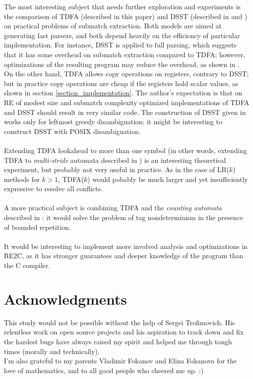 \documentclass{article}
\theoremstyle{definition}
\begin{document}
\begin{multicols}{2}
The most interesting subject that needs further exploration and experiments
is the comparison of TDFA (described in this paper) and DSST (described in \cite{Gra15} and \cite{GHRST16})
on practical problems of submatch extraction.
Both models are aimed at generating fast parsers,
and both depend heavily on the efficiency of particular implementation.
For instance, DSST is applied to full parsing, which suggests that it has some overhead on submatch extraction compared to TDFA;
however, optimizations of the resulting program may reduce the overhead, as shown in \cite{Gra15}.
On the other hand, TDFA allows copy operations on registers, contrary to DSST;
but in practice copy operations are cheap if the registers hold scalar values, as shown in section \ref{section_implementation}.
The author's expectation is that on RE of modest size and submatch complexity
optimized implementations of TDFA and DSST should result in very similar code.
The construction of DSST given in \cite{Gra15} works only for leftmost greedy disambiguation;
it might be interesting to construct DSST with POSIX disambiguation.
\\ \\
Extending TDFA lookahead to more than one symbol (in other words, extending TDFA to \emph{multi-stride} automata described in \cite{Bec09})
is an interesting theoretical experiment, but probably not very useful in practice.
As in the case of LR($k$) methods for $k > 1$, TDFA($k$) would pobably be much larger and yet insufficiently expressive to resolve all conflicts.
\\ \\
A more practical subject is combining TDFA and the \emph{counting automata} described in \cite{Bec09}:
it would solve the problem of tag nondeterminism in the presence of bounded repetition.
\\ \\
It would be interesting to implement more involved analysis and optimizations in RE2C,
as it has stronger guarantees and deeper knowledge of the program than the C compiler.

\section*{Acknowledgments}

This study would not be possible without the help of Sergei Trofimovich.
His relentless work on open source projects
and his aspiration to track down and fix the hardest bugs
have always raised my spirit and helped me through tough times (morally and technically).
\\

I'm also grateful to my parents Vladimir Fokanov and Elina Fokanova for the love of mathematics,
and to all good people who cheered me up. :)

\end{multicols}
\pagebreak

\nocite{*}


\end{document}
